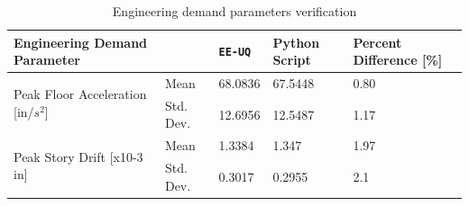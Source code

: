 \begin{table}[hbt!]                 
  \centering
\begin{adjustbox}{max width=\textwidth}            
  \begin{tabular}{lllll}                    
    \toprule          
      Engineering Demand Parameter &	 & \texttt{EE-UQ}	& Python Script	 & Percent Difference [\%]  \\ \hline
    
	\multirow{2}{*}{Peak Floor Acceleration [in/$s^2$]} 
	 & Mean &	68.0836	& 67.5448	& 0.80 \\
      & Std. Dev.	& 12.6956	 & 12.5487	& 1.17 \\ \hline
      
      \multirow{2}{*}{Peak Story Drift [x10-3 in]} 
      & Mean &	1.3384 &	1.347 &	1.97 \\
      & Std. Dev.	& 0.3017 &	0.2955	& 2.1	 \\

      \bottomrule      
                            
  \end{tabular}
\end{adjustbox}
  \caption{Engineering demand parameters verification}             
  \label{tab:edp}                 
\end{table}
